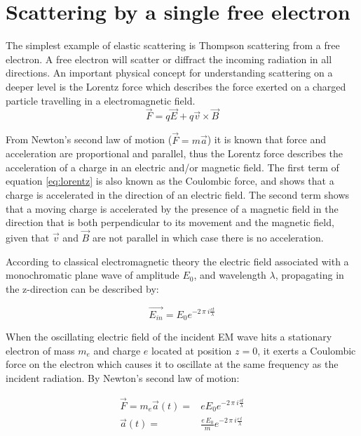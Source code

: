 \section{Scattering by a single free electron}
The simplest example of elastic scattering is Thompson scattering from a free electron. A free electron will scatter or diffract the incoming radiation in all directions. An important physical concept for understanding scattering on a deeper level is the Lorentz force which describes the force exerted on a charged particle travelling in a electromagnetic field. 
\begin{equation}\label{eq:lorentz}
\vec{F} = q\vec{E} + q\vec{v}\times\vec{B}
\end{equation} 

From Newton's second law of motion ($\vec{F} = m \vec{a}$) it is known that force and acceleration are
proportional and parallel, thus the Lorentz force describes the acceleration of a charge in an electric and/or magnetic field. The first term of equation \ref{eq:lorentz} is also known as the Coulombic force, and shows that a charge is accelerated in the direction of an electric field. The second term shows that a moving charge is accelerated by the presence of a magnetic field in the direction that is both perpendicular to its movement and the magnetic field, given that $\vec{v}$ and $\vec{B}$ are not parallel in which case there is no acceleration.

According to classical electromagnetic theory the electric field associated with a monochromatic plane wave of amplitude $E_0$, and wavelength $\lambda$, propagating in the z-direction can be described by: 

\begin{equation}\label{eq:plane_wave}
\vec{E_{in}} = E_0 e^{-2\,\pi\ i \frac{ c t }{\lambda}}
\end{equation} 

When the oscillating electric field of the incident EM wave hits a stationary electron of mass $m_e$ and charge $e$ located at position $z = 0$, it exerts a Coulombic force on the electron which causes it to oscillate at the same frequency as the incident radiation. By Newton's second law of motion:

\begin{align}\label{eq:motion_single}
\vec{F} = m_e \vec{a}(t) =& e E_0 e^{-2\,\pi\ i \frac{ c t}{\lambda}} \\
\vec{a}(t) =& \frac{e\,E_0}{m} e^{-2\,\pi\ i \frac{c\,t}{\lambda}}
\end{align}

